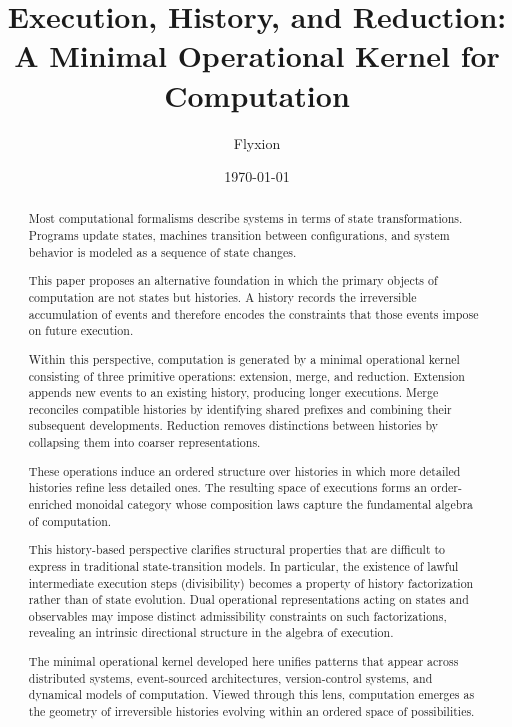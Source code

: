 \documentclass[12pt]{article}
\title{Execution, History, and Reduction:\\
A Minimal Operational Kernel for Computation}
\author{Flyxion}
\date{\today}
\begin{document}
\maketitle

\begin{abstract}

Most computational formalisms describe systems in terms of
state transformations. Programs update states, machines transition
between configurations, and system behavior is modeled as a sequence
of state changes.

This paper proposes an alternative foundation in which the primary
objects of computation are not states but histories. A history records
the irreversible accumulation of events and therefore encodes the
constraints that those events impose on future execution.

Within this perspective, computation is generated by a minimal
operational kernel consisting of three primitive operations:
extension, merge, and reduction. Extension appends new events to an
existing history, producing longer executions. Merge reconciles
compatible histories by identifying shared prefixes and combining
their subsequent developments. Reduction removes distinctions between
histories by collapsing them into coarser representations.

These operations induce an ordered structure over histories in which
more detailed histories refine less detailed ones. The resulting space
of executions forms an order-enriched monoidal category whose
composition laws capture the fundamental algebra of computation.

This history-based perspective clarifies structural properties that
are difficult to express in traditional state-transition models.
In particular, the existence of lawful intermediate execution steps
(divisibility) becomes a property of history factorization rather
than of state evolution. Dual operational representations acting on
states and observables may impose distinct admissibility constraints
on such factorizations, revealing an intrinsic directional structure
in the algebra of execution.

The minimal operational kernel developed here unifies patterns that
appear across distributed systems, event-sourced architectures,
version-control systems, and dynamical models of computation.
Viewed through this lens, computation emerges as the geometry of
irreversible histories evolving within an ordered space of
possibilities.

\end{abstract}
\end{document}
